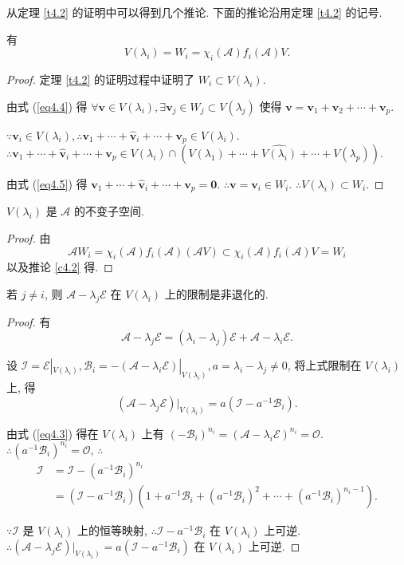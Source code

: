 \documentclass[color=black,device=normal,lang=cn,mode=geye]{elegantnote}
\begin{document}
从定理 \ref{t4.2} 的证明中可以得到几个推论. 下面的推论沿用定理 \ref{t4.2} 的记号.
\begin{corollary}\label{c4.2}
    有
    \[V(\lambda_i)=W_i=\chi_i(\mathcal{A})f_i(\mathcal{A})V.\]
\end{corollary}
\begin{proof}
    定理 \ref{t4.2} 的证明过程中证明了 $W_i\subset V(\lambda_i)$.

    由式 (\ref{eq4.4}) 得 $\forall\boldsymbol{v}\in V(\lambda_i),\exists\boldsymbol{v}_j\in W_j\subset V(\lambda_j)$ 使得 $\boldsymbol{v}=\boldsymbol{v}_1+\boldsymbol{v}_2+\cdots+\boldsymbol{v}_p$.

    $\because\boldsymbol{v}_i\in V(\lambda_i),\therefore\boldsymbol{v}_1+\cdots+\hat{\boldsymbol{v}}_i+\cdots+\boldsymbol{v}_p\in V(\lambda_i)$. $\therefore\boldsymbol{v}_1+\cdots+\hat{\boldsymbol{v}}_i+\cdots+\boldsymbol{v}_p\in V(\lambda_i)\cap(V(\lambda_1)+\cdots+\widehat{V(\lambda_i)}+\cdots+V(\lambda_p))$.

    由式 (\ref{eq4.5}) 得 $\boldsymbol{v}_1+\cdots+\hat{\boldsymbol{v}}_i+\cdots+\boldsymbol{v}_p=\boldsymbol{0}$. $\therefore\boldsymbol{v}=\boldsymbol{v}_i\in W_i$. $\therefore V(\lambda_i)\subset W_i$.
\end{proof}
\begin{corollary}
    $V(\lambda_i)$ 是 $\mathcal{A}$ 的不变子空间.
\end{corollary}
\begin{proof}
    由
    \[\mathcal{A}W_i=\chi_i(\mathcal{A})f_i(\mathcal{A})(\mathcal{A}V)\subset\chi_i(\mathcal{A})f_i(\mathcal{A})V=W_i\]
    以及推论 \ref{c4.2} 得.
\end{proof}
\begin{corollary}\label{c4.4}
    若 $j\neq i$, 则 $\mathcal{A}-\lambda_j\mathcal{E}$ 在 $V(\lambda_i)$ 上的限制是非退化的.
\end{corollary}
\begin{proof}
    有
    \[\mathcal{A}-\lambda_j\mathcal{E}=(\lambda_i-\lambda_j)\mathcal{E}+\mathcal{A}-\lambda_i\mathcal{E}.\]

    设 $\mathcal{I}=\mathcal{E}|_{V(\lambda_i)},\mathcal{B}_i=-(\mathcal{A}-\lambda_i\mathcal{E})|_{V(\lambda_i)},a=\lambda_i-\lambda_j\neq0$, 将上式限制在 $V(\lambda_i)$ 上, 得
    \[(\mathcal{A}-\lambda_j\mathcal{E})|_{V(\lambda_i)}=a(\mathcal{I}-a^{-1}\mathcal{B}_i).\]

    由式 (\ref{eq4.3}) 得在 $V(\lambda_i)$ 上有 $(-\mathcal{B}_i)^{n_i}=(\mathcal{A}-\lambda_i\mathcal{E})^{n_i}=\mathcal{O}$. $\therefore(a^{-1}\mathcal{B}_i)^{n_i}=\mathcal{O}$, $\therefore$
    \begin{align*}
        \mathcal{I} & =\mathcal{I}-(a^{-1}\mathcal{B}_i)^{n_i} \\
        & =(\mathcal{I}-a^{-1}\mathcal{B}_i)(1+a^{-1}\mathcal{B}_i+(a^{-1}\mathcal{B}_i)^2+\cdots+(a^{-1}\mathcal{B}_i)^{n_i-1}).
    \end{align*}

    $\because\mathcal{I}$ 是 $V(\lambda_i)$ 上的恒等映射, $\therefore\mathcal{I}-a^{-1}\mathcal{B}_i$ 在 $V(\lambda_i)$ 上可逆. $\therefore(\mathcal{A}-\lambda_j\mathcal{E})|_{V(\lambda_i)}=a(\mathcal{I}-a^{-1}\mathcal{B}_i)$ 在 $V(\lambda_i)$ 上可逆.
\end{proof}
\end{document}
